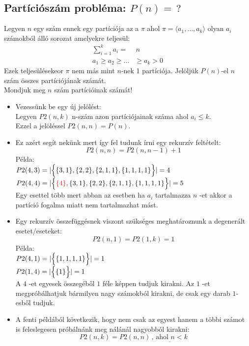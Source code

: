 \documentclass{article}
\theoremstyle{mytheoremstyle}
\theoremstyle{mytheoremstyle}
\theoremstyle{myproblemstyle}
\begin{document}
\subsection{Partíciószám probléma: $P(n)=\,?$}
Legyen $n$ egy szám ennek egy partíciója az a $\pi$ ahol
$\pi = \langle a_1,\ldots,a_k\rangle$ olyan $a_i$ számokból álló
sorozat amelyekre teljesül:
\begin{align*}
    \sum_{i=1}^{k}a_i=&\,n\\
    a_1\geq a_2\geq\ldots&\geq a_k >0
\end{align*}
Ezek teljesülésekeor $\pi$ nem más mint $n$-nek 1 partíciója. 
Jelöljük $P(n)$-el $n$ szám összes partíciójának számát.\\
Mondjuk meg $n$ szám partícióinak számát!\\
\begin{itemize}
    \item
Vezessünk be egy új jelölést: \\
Legyen $P2(n,k)$ n-szám azon partíciójainak száma ahol $a_i\leq k$.\\
Ezzel a jelöléssel $P2(n,n)=P(n)$.
\item
Ez azért segít nekünk mert így fel tudunk írni egy rekurzív feltételt:\\
$$P2(n,n) = P2(n,n-1) + 1$$
Példa:\\
$P2(4,3) = |\Bigl\{\{3,1\},\{2,2\},\{2,1,1\},\{1,1,1,1\}\Bigr\}|=4$\\ 
$P2(4,4) = |\Bigl\{\color{red}\{4\}\color{black},\{3,1\},\{2,2\}
,\{2,1,1\},\{1,1,1,1\}\Bigr\}|=5$\\ 
Egy esettel több mert abban az esetben ha
\color{red}$a_i$ \color{black} 
tartalmazza $n$ -et akkor a partíció fogalma miatt nem tartalmazhat mást.
\item
Egy rekurzív összefüggésnek viszont szükséges 
meghatároznunk a degenerált esetet/eseteket:
$$ P2(n,1) = P2(1,k) = 1 $$
Példa:\\
$P2(4,1) = |\Bigl\{\color{black}\{1,1,1,1\}\color{black}\Bigr\}|=1$\\ 
$P2(1,4) = |\Bigl\{\color{black}\{1\}\color{black}\Bigr\}|=1$\\ 
A $4$ -et egyesek összegéből $1$ féle képpen tudjuk kirakni.
Az $1$ -et megpróbálhatjuk bármilyen nagy számokból kirakni, 
de csak egy darab $1$-esből tudjuk.
\item 
A fenti példából következik, hogy nem csak az egyest hanem a 
többi számot is feleslegesen próbálnánk meg nálánál 
nagyobból kirakni:
$$P2(n,k) = P2(n,n)\,\underline{\text{, ahol }n<k}$$

\end{itemize}
\end{document}
